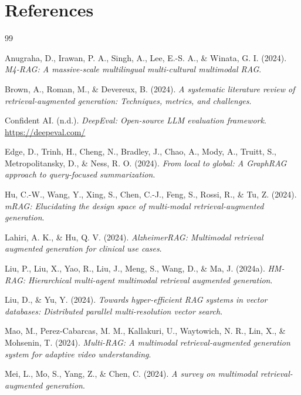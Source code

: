 \documentclass[12pt,a4paper,oneside]{report}
\begin{document}
\chapter*{References}
\begin{thebibliography}{99}

Anugraha, D., Irawan, P. A., Singh, A., Lee, E.-S. A., \& Winata, G. I. (2024). \textit{M4-RAG: A massive-scale multilingual multi-cultural multimodal RAG}.

Brown, A., Roman, M., \& Devereux, B. (2024). \textit{A systematic literature review of retrieval-augmented generation: Techniques, metrics, and challenges}.

Confident AI. (n.d.). \textit{DeepEval: Open-source LLM evaluation framework}. \url{https://deepeval.com/}

Edge, D., Trinh, H., Cheng, N., Bradley, J., Chao, A., Mody, A., Truitt, S., Metropolitansky, D., \& Ness, R. O. (2024). \textit{From local to global: A GraphRAG approach to query-focused summarization}.

Hu, C.-W., Wang, Y., Xing, S., Chen, C.-J., Feng, S., Rossi, R., \& Tu, Z. (2024). \textit{mRAG: Elucidating the design space of multi-modal retrieval-augmented generation}.

Lahiri, A. K., \& Hu, Q. V. (2024). \textit{AlzheimerRAG: Multimodal retrieval augmented generation for clinical use cases}.

Liu, P., Liu, X., Yao, R., Liu, J., Meng, S., Wang, D., \& Ma, J. (2024a). \textit{HM-RAG: Hierarchical multi-agent multimodal retrieval augmented generation}.

Liu, D., \& Yu, Y. (2024). \textit{Towards hyper-efficient RAG systems in vector databases: Distributed parallel multi-resolution vector search}.

Mao, M., Perez-Cabarcas, M. M., Kallakuri, U., Waytowich, N. R., Lin, X., \& Mohsenin, T. (2024). \textit{Multi-RAG: A multimodal retrieval-augmented generation system for adaptive video understanding}.

Mei, L., Mo, S., Yang, Z., \& Chen, C. (2024). \textit{A survey on multimodal retrieval-augmented generation}.


\end{thebibliography}
\end{document}
